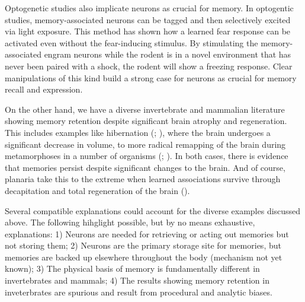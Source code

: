 \documentclass[
  jou,
  floatsintext,
  longtable,
  nolmodern,
  notxfonts,
  notimes,
  donotrepeattitle,
  colorlinks=true,linkcolor=blue,citecolor=blue,urlcolor=blue]{apa7}
\begin{document}
Optogenetic studies also implicate neurons as crucial for memory. In
optogentic studies, memory-associated neurons can be tagged and then
selectively excited via light exposure. This method has shown how a
learned fear response can be activated even without the fear-inducing
stimulus. By stimulating the memory-associated engram neurons while the
rodent is in a novel environment that has never been paired with a
shock, the rodent will show a freezing response. Clear manipulations of
this kind build a strong case for neurons as crucial for memory recall
and expression.

On the other hand, we have a diverse invertebrate and mammalian
literature showing memory retention despite significant brain atrophy
and regeneration. This includes examples like hibernation
(;
), where
the brain undergoes a significant decrease in volume, to more radical
remapping of the brain during metamorphoses in a number of organisms
(;
). In
both cases, there is evidence that memories persist despite significant
changes to the brain. And of course, planaria take this to the extreme
when learned associations survive through decapitation and total
regeneration of the brain ().

Several compatible explanations could account for the diverse examples
discussed above. The following hihglight possible, but by no means
exhaustive, explanations: 1) Neurons are needed for retrieving or acting
out memories but not storing them; 2) Neurons are the primary storage
site for memories, but memories are backed up elsewhere throughout the
body (mechanism not yet known); 3) The physical basis of memory is
fundamentally different in invertebrates and mammals; 4) The results
showing memory retention in inveterbrates are spurious and result from
procedural and analytic biases.
\end{document}
